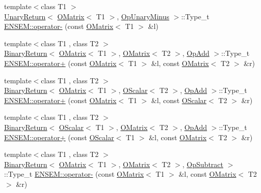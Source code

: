 \begin{DoxyCompactItemize}
\item 
{\footnotesize template$<$class T1 $>$ }\\\mbox{\hyperlink{structENSEM_1_1UnaryReturn}{Unary\+Return}}$<$ \mbox{\hyperlink{classENSEM_1_1OMatrix}{O\+Matrix}}$<$ T1 $>$, \mbox{\hyperlink{structENSEM_1_1OpUnaryMinus}{Op\+Unary\+Minus}} $>$\+::Type\+\_\+t \mbox{\hyperlink{group__obsmatrix_gaf8abde7e3428822593f11a4317f48880}{E\+N\+S\+E\+M\+::operator-\/}} (const \mbox{\hyperlink{classENSEM_1_1OMatrix}{O\+Matrix}}$<$ T1 $>$ \&l)
\item 
{\footnotesize template$<$class T1 , class T2 $>$ }\\\mbox{\hyperlink{structENSEM_1_1BinaryReturn}{Binary\+Return}}$<$ \mbox{\hyperlink{classENSEM_1_1OMatrix}{O\+Matrix}}$<$ T1 $>$, \mbox{\hyperlink{classENSEM_1_1OMatrix}{O\+Matrix}}$<$ T2 $>$, \mbox{\hyperlink{structENSEM_1_1OpAdd}{Op\+Add}} $>$\+::Type\+\_\+t \mbox{\hyperlink{group__obsmatrix_ga0ad42a3395997cd3a2d836e981969fe2}{E\+N\+S\+E\+M\+::operator+}} (const \mbox{\hyperlink{classENSEM_1_1OMatrix}{O\+Matrix}}$<$ T1 $>$ \&l, const \mbox{\hyperlink{classENSEM_1_1OMatrix}{O\+Matrix}}$<$ T2 $>$ \&r)
\item 
{\footnotesize template$<$class T1 , class T2 $>$ }\\\mbox{\hyperlink{structENSEM_1_1BinaryReturn}{Binary\+Return}}$<$ \mbox{\hyperlink{classENSEM_1_1OMatrix}{O\+Matrix}}$<$ T1 $>$, \mbox{\hyperlink{classENSEM_1_1OScalar}{O\+Scalar}}$<$ T2 $>$, \mbox{\hyperlink{structENSEM_1_1OpAdd}{Op\+Add}} $>$\+::Type\+\_\+t \mbox{\hyperlink{group__obsmatrix_ga594575d5bb0ce31fd07e9fb29fd9c8ac}{E\+N\+S\+E\+M\+::operator+}} (const \mbox{\hyperlink{classENSEM_1_1OMatrix}{O\+Matrix}}$<$ T1 $>$ \&l, const \mbox{\hyperlink{classENSEM_1_1OScalar}{O\+Scalar}}$<$ T2 $>$ \&r)
\item 
{\footnotesize template$<$class T1 , class T2 $>$ }\\\mbox{\hyperlink{structENSEM_1_1BinaryReturn}{Binary\+Return}}$<$ \mbox{\hyperlink{classENSEM_1_1OScalar}{O\+Scalar}}$<$ T1 $>$, \mbox{\hyperlink{classENSEM_1_1OMatrix}{O\+Matrix}}$<$ T2 $>$, \mbox{\hyperlink{structENSEM_1_1OpAdd}{Op\+Add}} $>$\+::Type\+\_\+t \mbox{\hyperlink{group__obsmatrix_ga6cdb2a903fbc9f5a836a442a81275a56}{E\+N\+S\+E\+M\+::operator+}} (const \mbox{\hyperlink{classENSEM_1_1OScalar}{O\+Scalar}}$<$ T1 $>$ \&l, const \mbox{\hyperlink{classENSEM_1_1OMatrix}{O\+Matrix}}$<$ T2 $>$ \&r)
\item 
{\footnotesize template$<$class T1 , class T2 $>$ }\\\mbox{\hyperlink{structENSEM_1_1BinaryReturn}{Binary\+Return}}$<$ \mbox{\hyperlink{classENSEM_1_1OMatrix}{O\+Matrix}}$<$ T1 $>$, \mbox{\hyperlink{classENSEM_1_1OMatrix}{O\+Matrix}}$<$ T2 $>$, \mbox{\hyperlink{structENSEM_1_1OpSubtract}{Op\+Subtract}} $>$\+::Type\+\_\+t \mbox{\hyperlink{group__obsmatrix_ga71b6bee34df2dbf2b2312b75612fd45f}{E\+N\+S\+E\+M\+::operator-\/}} (const \mbox{\hyperlink{classENSEM_1_1OMatrix}{O\+Matrix}}$<$ T1 $>$ \&l, const \mbox{\hyperlink{classENSEM_1_1OMatrix}{O\+Matrix}}$<$ T2 $>$ \&r)

\end{DoxyCompactItemize}
